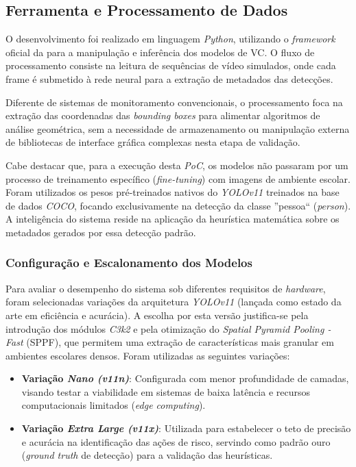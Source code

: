 \documentclass[12pt]{article}
\begin{document}
\subsection{Ferramenta e Processamento de Dados}

O desenvolvimento foi realizado em linguagem \textit{Python}, utilizando o \textit{framework} 
oficial da \cite{ultralytics_docs} para a manipulação e inferência dos modelos de VC. O fluxo de 
processamento consiste na leitura de sequências de vídeo simulados, onde cada frame é submetido
à rede neural para a extração de metadados das detecções.

Diferente de sistemas de monitoramento convencionais, o processamento foca na extração das
coordenadas das \textit{bounding boxes} para alimentar algoritmos de análise geométrica,
sem a necessidade de armazenamento ou manipulação externa de bibliotecas de interface gráfica
complexas nesta etapa de validação.

Cabe destacar que, para a execução desta \textit{PoC}, os modelos não passaram por um processo
de treinamento específico (\textit{fine-tuning}) com imagens de ambiente escolar. Foram utilizados
os pesos pré-treinados nativos do \textit{YOLOv11} treinados na base de dados \textit{COCO}, focando
exclusivamente na detecção da classe ''pessoa`` (\textit{person}). A inteligência do sistema reside
na aplicação da heurística matemática sobre os metadados gerados por essa detecção padrão.

\subsubsection{Configuração e Escalonamento dos Modelos}

Para avaliar o desempenho do sistema sob diferentes requisitos de \textit{hardware}, foram selecionadas 
variações da arquitetura \textit{YOLOv11} (lançada como estado da arte em eficiência e acurácia). A 
escolha por esta versão justifica-se pela introdução dos módulos \textit{C3k2} e pela otimização
do \textit{Spatial Pyramid Pooling - Fast} (SPPF), que permitem uma extração de características 
mais granular em ambientes escolares densos. Foram utilizadas as seguintes variações:

\begin{itemize}

    \item \textbf{Variação \textit{Nano (v11n)}}: Configurada com menor profundidade de camadas, 
    visando testar a viabilidade em sistemas de baixa latência e recursos computacionais limitados 
    (\textit{edge computing}).
    
    \item \textbf{Variação \textit{Extra Large (v11x)}}: Utilizada para estabelecer o teto de precisão 
    e acurácia na identificação das ações de risco, servindo como padrão ouro (\textit{ground truth}
    de detecção) para a validação das heurísticas.
    
\end{itemize}
\end{document}
